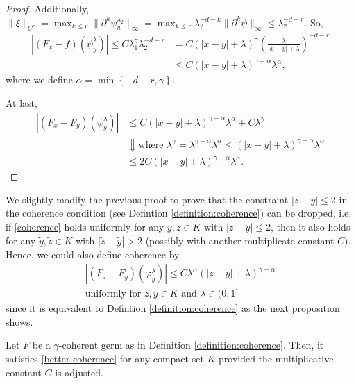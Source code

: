 \begin{proof}
   Additionally, $\lVert \xi \rVert_{C^{r}} = \max_{k \leq r}\lVert \partial^k \psi^{\lambda_2}_w \rVert_\infty = \max_{k \leq r} \lambda_2^{-d-k} \lVert \partial^k \psi \rVert_{\infty} \leq \lambda_2^{-d - r}$. So,
   \begin{align*}
    |(F_x - f)(\psi^\lambda_y)| \leq C\lambda_1^\gamma \lambda_2^{-d-r} &= C(|x-y| + \lambda)^\gamma\left(\frac{\lambda}{|x-y|  + \lambda}\right)^{-d-r} \\
    &\leq C  (|x-y| + \lambda)^{\gamma - \alpha} \lambda^\alpha,
   \end{align*}
    where we define $\alpha = \min\left\{ -d-r , \gamma \right\}$. 
    
    At last, 
    \begin{align*}
        |(F_x - F_y)(\psi^\lambda_y)| &\leq C  (|x-y| + \lambda)^{\gamma - \alpha} \lambda^\alpha + C \lambda^\gamma \\
        &\Downarrow \text{where $\lambda^\gamma = \lambda^{\gamma - \alpha} \lambda^\alpha \leq (|x-y| + \lambda)^{\gamma - \alpha} \lambda^\alpha$} \\
        &\leq 2C  (|x-y| + \lambda)^{\gamma - \alpha} \lambda^\alpha.
    \end{align*}
\end{proof}

We slightly modify the previous proof to prove that the constraint $|z-y| \leq 2$ in the coherence condition (see Defintion \ref{definition:coherence}) can be dropped, i.e. if \eqref{coherence} holds uniformly for any $y,z \in K$ with $|z-y| \leq 2$, then it also holds for any $\tilde y, \tilde z \in K$ with $|\tilde z- \tilde y| > 2$ (possibly with another multiplicate constant $C$). Hence, we could also define coherence by
\begin{gather}\label{better-coherence}
    |(F_z - F_y)(\varphi^\lambda_y)| \leq C\lambda^\alpha(|z-y| + \lambda)^{\gamma - \alpha}  \\ \text{uniformly for $z,y \in K$ and $\lambda \in (0,1]$} \nonumber
\end{gather}
since it is equivalent to Defintion \ref{definition:coherence} as the next proposition shows. 

\begin{proposition}\label{proposition:cutoff}
    Let $F$ be a $\gamma$-coherent germ as in Definition \ref{definition:coherence}. Then, it satisfies \eqref{better-coherence} for any compact set $K$ provided the multiplicative constant $C$ is adjusted.
\end{proposition}

